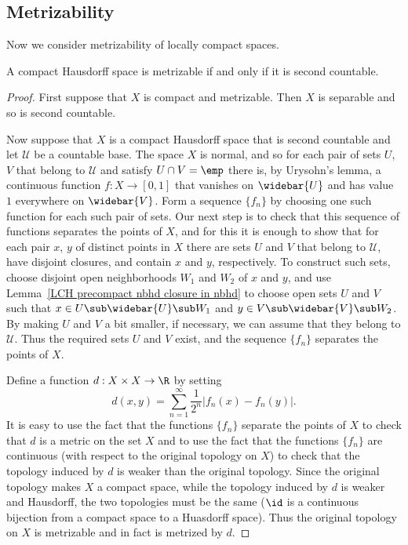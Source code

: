 \subsection{Metrizability}
Now we consider metrizability of locally compact spaces.
\begin{proposition}\label{compact Hausdorff metrizable iff C_2}
A compact Hausdorff space is metrizable if and only if it is second countable.
\end{proposition}
\begin{proof}
First suppose that $X$ is compact and metrizable. Then $X$ is separable and so is second countable.\par
Now suppose that $X$ is a compact Hausdorff space that is second countable and let $\mathcal{U}$ be a countable base. The space $X$ is normal, and so for each pair of sets $U$, $V$ that belong to $\mathcal{U}$ and satisfy $U\cap V=\emp$ there is, by Urysohn's lemma, a continuous function $f:X\to[0,1]$ that vanishes on $\widebar{U}$ and has value $1$ everywhere on $\widebar{V}$. Form a sequence $\{f_n\}$ by choosing one such function for each such pair of sets. Our next step is to check that this sequence of functions separates the points of $X$, and for this it is enough to show that for each pair $x$, $y$ of distinct points in $X$ there are sets $U$ and $V$ that belong to $\mathcal{U}$, have disjoint closures, and contain $x$ and $y$, respectively. To construct such sets, choose disjoint open neighborhoods $W_1$ and $W_2$ of $x$ and $y$, and use Lemma~\ref{LCH precompact nbhd closure in nbhd} to choose open sets $U$ and $V$ such that $x\in U\sub\widebar{U}\sub W_1$ and $y\in V\sub\widebar{V}\sub W_2$. By making $U$ and $V$ a bit smaller, if necessary, we can assume that they belong to $\mathcal{U}$. Thus the required sets $U$ and $V$ exist, and the sequence $\{f_n\}$ separates the points of $X$.\par
Define a function $d:X\times X\to\R$ by setting
\[d(x,y)=\sum_{n=1}^{\infty}\frac{1}{2^n}|f_n(x)-f_n(y)|.\]
It is easy to use the fact that the functions $\{f_n\}$ separate the points of $X$ to check that $d$ is a metric on the set $X$ and to use the fact that the functions $\{f_n\}$ are continuous (with respect to the original topology on $X$) to check that the topology induced by $d$ is weaker than the original topology. Since the original topology makes $X$ a compact space, while the topology induced by $d$ is weaker and Hausdorff, the two topologies must be the same ($\id$ is a continuous bijection from a compact space to a Huasdorff space). Thus the original topology on $X$ is metrizable and in fact is metrized by $d$.
\end{proof}
